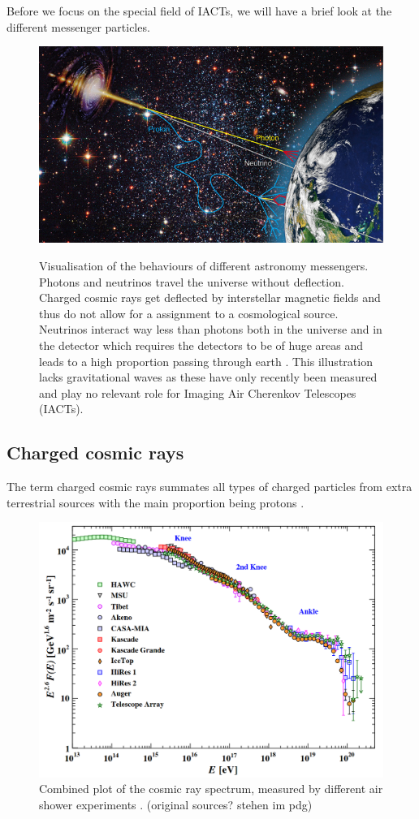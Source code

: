 Before we focus on the special field of IACTs, we will have
a brief look at the different messenger particles.

\begin{figure}
	\centering
	\includegraphics[width=.8\textwidth]{images/astro-web-titel.jpg}
	\label{fig:multi_messenger}
	\caption{Visualisation of the behaviours of different astronomy messengers.
		Photons and neutrinos 
		travel the universe without deflection.
		Charged cosmic rays get deflected by interstellar
		magnetic fields and thus do not allow for a assignment to a cosmological source.
		Neutrinos interact way less than photons both in the universe and in the detector 
		which requires the detectors to be of huge areas and leads to a high 
		proportion passing through earth
		\cite{desy_mm_astro}.
		This illustration lacks gravitational waves 
		as these have only recently been measured and play no relevant role 
		for Imaging Air Cherenkov Telescopes (IACTs).
	}
\end{figure}


\subsection{Charged cosmic rays}
The term charged cosmic rays summates all types of charged particles from
extra terrestrial sources with the main proportion being protons
\cite{Dembinski:2017zsh}.


\begin{figure}
	\centering
	\includegraphics[width=.8\textwidth]{images/cr_spectrum.png}
	\caption{Combined plot of the cosmic ray spectrum,
		measured by different air shower experiments \cite{pdg19}. 
		(original sources? stehen im pdg)
	}
	\label{fig:cr_spectrum}
\end{figure}

